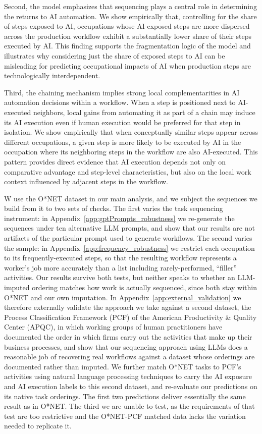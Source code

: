 Second, the model emphasizes that sequencing plays a central role in determining the returns to AI automation.
We show empirically that, controlling for the share of steps exposed to AI, occupations whose AI-exposed steps are more dispersed across the production workflow exhibit a substantially lower share of their steps executed by AI.
This finding supports the fragmentation logic of the model and illustrates why considering just the share of exposed steps to AI can be misleading for predicting occupational impacts of AI when production steps are technologically interdependent.

Third, the chaining mechanism implies strong local complementarities in AI automation decisions within a workflow.
When a step is positioned next to AI-executed neighbors, local gains from automating it as part of a chain may induce its AI execution even if human execution would be preferred for that step in isolation.
We show empirically that when conceptually similar steps appear across different occupations, a given step is more likely to be executed by AI in the occupation where its neighboring steps in the workflow are also AI-executed.
This pattern provides direct evidence that AI execution depends not only on comparative advantage and step-level characteristics, but also on the local work context influenced by adjacent steps in the workflow.

W use the O*NET dataset in our main analysis, and we subject the sequences we build from it to two sets of checks.
The first varies the task sequencing instrument: in Appendix~\ref{app:gptPrompts_robustness} we re-generate the sequences under ten alternative LLM prompts, and show that our results are not artifacts of the particular prompt used to generate workflows.
The second varies the sample: in Appendix~\ref{app:frequency_robustness} we restrict each occupation to its frequently-executed steps, so that the resulting workflow represents a worker's job more accurately than a list including rarely-performed, ``filler'' activities.
Our results survive both tests, but neither speaks to whether an LLM-imputed ordering matches how work is actually sequenced, since both stay within O*NET and our own imputation.
In Appendix~\ref{app:external_validation} we therefore externally validate the approach we take against a second dataset, the Process Classification Framework (PCF) of the American Productivity \& Quality Center (APQC), in which working groups of human practitioners have documented the order in which firms carry out the activities that make up their business processes, and show that our sequencing approach using LLMs does a reasonable job of recovering real workflows against a dataset whose orderings are documented rather than imputed.
We further match O*NET tasks to PCF's activities using natural language processing techniques to carry the AI exposure and AI execution labels to this second dataset, and re-evaluate our predictions on its native task orderings.
The first two predictions deliver essentially the same result as in O*NET.
The third we are unable to test, as the requirements of that test are too restrictive and the O*NET-PCF matched data lacks the variation needed to replicate it.